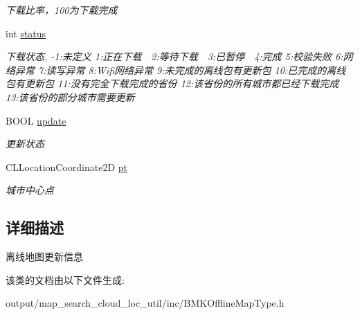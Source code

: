 \begin{DoxyCompactItemize}
\begin{DoxyCompactList}\small\item\em 下载比率，100为下载完成 \end{DoxyCompactList}\item 
\hypertarget{interface_b_m_k_o_l_update_element_a1e980d13929fc0dc732edddf1ae13bf2}{int \hyperlink{interface_b_m_k_o_l_update_element_a1e980d13929fc0dc732edddf1ae13bf2}{status}}\label{interface_b_m_k_o_l_update_element_a1e980d13929fc0dc732edddf1ae13bf2}

\begin{DoxyCompactList}\small\item\em 下载状态, -\/1\+:未定义 1\+:正在下载　2\+:等待下载　3\+:已暂停　4\+:完成 5\+:校验失败 6\+:网络异常 7\+:读写异常 8\+:Wifi网络异常 9\+:未完成的离线包有更新包 10\+:已完成的离线包有更新包 11\+:没有完全下载完成的省份 12\+:该省份的所有城市都已经下载完成 13\+:该省份的部分城市需要更新 \end{DoxyCompactList}\item 
\hypertarget{interface_b_m_k_o_l_update_element_a1adc137eba11d9ae142310d3556bc446}{B\+O\+O\+L \hyperlink{interface_b_m_k_o_l_update_element_a1adc137eba11d9ae142310d3556bc446}{update}}\label{interface_b_m_k_o_l_update_element_a1adc137eba11d9ae142310d3556bc446}

\begin{DoxyCompactList}\small\item\em 更新状态 \end{DoxyCompactList}\item 
\hypertarget{interface_b_m_k_o_l_update_element_a9e229b507ced476146db8f80c71ea5bd}{C\+L\+Location\+Coordinate2\+D \hyperlink{interface_b_m_k_o_l_update_element_a9e229b507ced476146db8f80c71ea5bd}{pt}}\label{interface_b_m_k_o_l_update_element_a9e229b507ced476146db8f80c71ea5bd}

\begin{DoxyCompactList}\small\item\em 城市中心点 \end{DoxyCompactList}\end{DoxyCompactItemize}


\subsection{详细描述}
离线地图更新信息 

该类的文档由以下文件生成\+:\begin{DoxyCompactItemize}
\item 
output/map\+\_\+search\+\_\+cloud\+\_\+loc\+\_\+util/inc/B\+M\+K\+Offline\+Map\+Type.\+h\end{DoxyCompactItemize}
